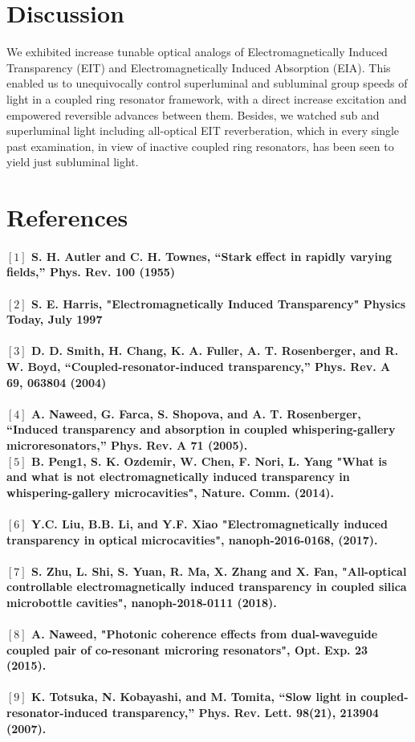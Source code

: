 \newpage
\section{Discussion}
We exhibited increase tunable optical analogs of Electromagnetically Induced Transparency (EIT) and Electromagnetically Induced Absorption (EIA). This enabled us to unequivocally control superluminal and subluminal group speeds of light in a coupled ring resonator framework, with a direct increase excitation and empowered reversible advances between them. Besides, we watched sub and superluminal light including all-optical EIT reverberation, which in every single past examination, in view of inactive coupled ring resonators, has been seen to yield just subluminal light.


\newpage
\section*{References}

\paragraph{\normalfont \large $[1]$ S. H. Autler and C. H. Townes, “Stark effect in rapidly varying fields,” Phys. Rev. \textbf{100} (1955) \\ 
\\$[2]$ S. E. Harris, "Electromagnetically Induced Transparency" Physics Today, July 1997 \\
\\$[3]$ D. D. Smith, H. Chang, K. A. Fuller, A. T. Rosenberger, and R. W. Boyd, “Coupled-resonator-induced transparency,” Phys. Rev. A \textbf{69}, 063804 (2004) \\
\\$[4]$  A. Naweed, G. Farca, S. Shopova, and A. T. Rosenberger, “Induced transparency and absorption in coupled
whispering-gallery microresonators,” Phys. Rev. A \textbf{71} (2005).
\\ $[5]$ B. Peng1, S. K. Ozdemir, W. Chen, F. Nori, L. Yang "What is and what is not electromagnetically induced transparency in whispering-gallery microcavities", Nature. Comm. (2014).\\
\\ $[6]$ Y.C. Liu, B.B. Li, and Y.F. Xiao "Electromagnetically induced transparency in optical microcavities", nanoph-2016-0168, (2017).\\
\\ $[7]$ S. Zhu, L. Shi, S. Yuan, R. Ma, X. Zhang and X. Fan, "All-optical controllable electromagnetically induced transparency in coupled silica microbottle cavities", nanoph-2018-0111 (2018).\\
\\ $[8]$ A. Naweed, "Photonic coherence effects from dual-waveguide
coupled pair of co-resonant microring resonators", Opt. Exp. \textbf{23} (2015).\\
\\ $[9]$ K. Totsuka, N. Kobayashi, and M. Tomita, “Slow light in coupled-resonator-induced transparency,” Phys. Rev.
Lett. \textbf{98}(21), 213904 (2007).}